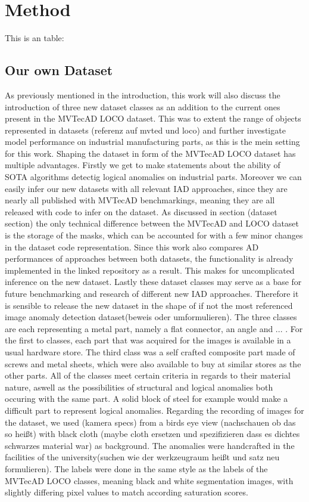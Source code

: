 \chapter{Method}
\label{chap:method}
This is an table:



\section{Our own Dataset}
As previously mentioned in the introduction, this work will also discuss the introduction of three new dataset classes as an addition to the current ones present in the MVTecAD LOCO dataset.
This was to extent the range of objects represented in datasets (referenz auf mvted und loco) and further investigate model performance on industrial manufacturing parts, as this is the 
mein setting for this work. Shaping the dataset in form of the MVTecAD LOCO dataset has multiple advantages. Firstly we get to make statements about the ability of SOTA algorithms detectig 
logical anomalies on industrial parts. Moreover we can easily infer our new datasets with all relevant IAD approaches, since they are nearly all published with MVTecAD benchmarkings, meaning 
they are all released with code to infer on the dataset. As discussed in section (dataset section) the only technical difference between the MVTecAD and LOCO dataset is the storage of the masks, 
which can be accounted for with a few minor changes in the dataset code representation. Since this work also compares AD performances of approaches between both datasets, the functionality 
is already implemented in the linked repository as a result. This makes for uncomplicated inference on the new dataset. Lastly these dataset classes may serve as a base for future benchmarking 
and research of different new IAD approaches. Therefore it is sensible to release the new dataset in the shape of if not the most referenced image anomaly detection dataset(beweis oder umformulieren). 
The three classes are each representing a metal part, namely a flat connector, an angle and ... . For the first to classes, each part that was acquired for the images is available in a 
usual hardware store. The third class was a self crafted composite part made of screws and metal sheets, which were also available to buy at similar stores as the other parts. All of the classes 
meet certain criteria in regards to their material nature, aswell as the possibilities of structural and logical anomalies both occuring with the same part. A solid block of steel for example 
would make a difficult part to represent logical anomalies.
Regarding the recording of images for the dataset, we used (kamera specs) from a birds eye view (nachschauen ob das so heißt) with black cloth (maybe cloth ersetzen und spezifizieren dass es 
dichtes schwarzes material war) as background. The anomalies were handcrafted in the facilities of the university(suchen wie der werkzeugraum heißt und satz neu formulieren). The labels 
were done in the same style as the labels of the MVTecAD LOCO classes, meaning black and white segmentation images, with slightly differing pixel values to match according saturation scores. 

